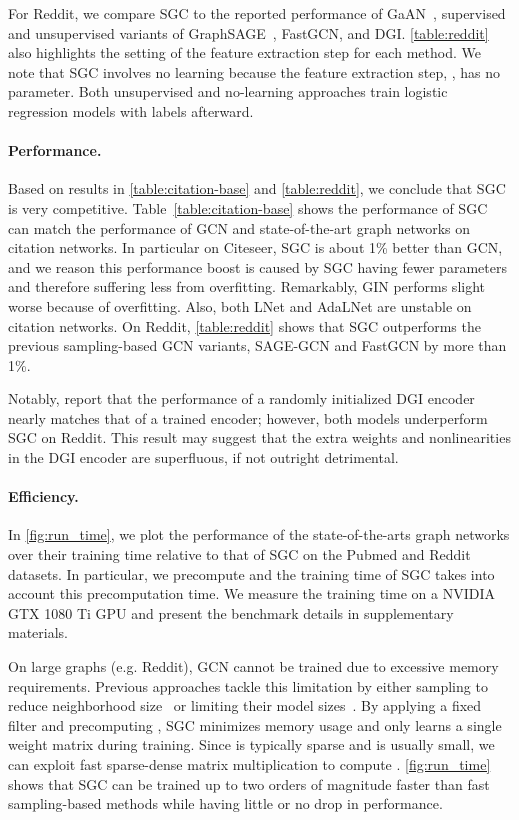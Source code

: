 \documentclass{article}
\newcommand{\method}{SGC}
\begin{document}
For Reddit, we compare \method{} to the reported performance of GaAN~\cite{zhang2018gaan}, supervised and unsupervised variants of GraphSAGE~\cite{Hamilton17}, FastGCN, and DGI. \autoref{table:reddit} also highlights the setting of the feature extraction step for each method. 
We note that \method{} involves no learning because the feature extraction step, , has no parameter. Both unsupervised and no-learning approaches train logistic regression models with labels afterward.


\paragraph{Performance.}
Based on results in \autoref{table:citation-base} and \autoref{table:reddit}, we conclude that \method{} is very competitive. 
Table~\ref{table:citation-base} shows the performance of \method{} can match the performance of GCN and state-of-the-art graph networks on citation networks.
In particular on Citeseer, \method{} is about 1\% better than GCN, and we reason this performance boost is caused by \method{} having fewer parameters and therefore suffering less from overfitting.
Remarkably, GIN performs slight worse because of overfitting. Also, both LNet and AdaLNet are unstable on citation networks.
On Reddit, \autoref{table:reddit} shows that \method{} outperforms the previous sampling-based GCN variants, SAGE-GCN and FastGCN by more than 1\%. 

Notably, \citet{infomax} report that the performance of a randomly initialized DGI encoder nearly matches that of a trained encoder; however, both models underperform \method{} on Reddit.   
This result may suggest that the extra weights and nonlinearities in the DGI encoder are superfluous, if not outright detrimental. 

\paragraph{Efficiency.} 
In \autoref{fig:run_time}, we plot the performance of the state-of-the-arts graph networks over their training time relative to that of \method{} on the Pubmed and Reddit datasets. In particular, we precompute  and the training time of \method{} takes into account this precomputation time.
We measure the training time on a NVIDIA GTX 1080 Ti GPU and present the benchmark details in supplementary materials.

On large graphs (e.g. Reddit), GCN cannot be trained due to excessive memory requirements. 
Previous approaches tackle this limitation by either sampling to reduce neighborhood size~\cite{FastGCN, Hamilton17} or limiting their model sizes~\cite{infomax}.
By applying a fixed filter and precomputing , \method{} minimizes memory usage and only learns a single weight matrix during training. Since  is typically sparse and  is usually small, we can exploit fast sparse-dense matrix multiplication to compute .
\autoref{fig:run_time} shows that \method{} can be trained up to two orders of magnitude faster than fast sampling-based methods while having little or no drop in performance.
\end{document}
